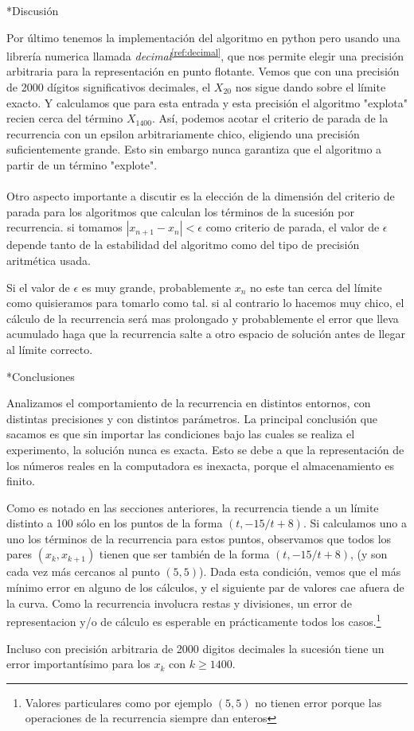 \documentclass[12pt,titlepage]{article}
\newenvironment{usection}[1]{\newpage\begin{section}*{#1}	\addcontentsline{toc}{section}{#1}}{\end{section}}
\newcommand{\superref}[1]{\textsuperscript{\ref{#1}}}
\begin{document}
\begin{usection}{Discusión}
		Por último tenemos la implementación del algoritmo en python
		pero usando una librería numerica llamada \textit{decimal}\superref{ref:decimal},
		que nos permite elegir una precisión arbitraria para
		la representación en punto flotante.
		Vemos que con una precisión de 2000 dígitos significativos decimales,
		el $X_{20}$ nos sigue dando sobre el límite exacto.
		Y calculamos que para esta entrada y esta precisión
		el algoritmo "explota" recien cerca del término $X_{1400}$.
		Así, podemos acotar el criterio de parada de la recurrencia
		con un epsilon arbitrariamente chico, eligiendo una precisión
		suficientemente grande. Esto sin embargo nunca garantiza
		que el algoritmo a partir de un término "explote". \\
\\
		Otro aspecto importante a discutir es la elección
		de la dimensión del criterio de parada para los algoritmos
		que calculan los términos de la sucesión por recurrencia.
		si tomamos $|x_{n+1}-x_n| < \epsilon$ como criterio de parada,
		el valor de $\epsilon$ depende tanto de la estabilidad
		del algoritmo como del tipo de precisión aritmética usada.

		Si el valor de $\epsilon$ es muy grande, probablemente $x_n$
		no este tan cerca del límite como quisieramos para tomarlo como tal.
		si al contrario lo hacemos muy chico, el cálculo de la recurrencia
		será mas prolongado y probablemente el error que lleva acumulado
		haga que la recurrencia salte a otro espacio de solución antes de llegar al límite correcto.

	\end{usection}
	
	\begin{usection}{Conclusiones}
		Analizamos el comportamiento de la recurrencia en distintos entornos, con distintas precisiones y con distintos parámetros.
		La principal conclusión que sacamos es que sin importar las condiciones bajo las cuales se realiza el experimento, la solución nunca es exacta.
		Esto se debe a que la representación de los números reales en la computadora es inexacta, porque el almacenamiento es finito.
		
		Como es notado en las secciones anteriores, la recurrencia tiende a un límite distinto a 100 sólo en los puntos de la forma $(t, -15/t + 8)$. Si calculamos uno a uno los términos de la recurrencia para estos puntos, observamos que todos los pares $(x_k,x_{k+1})$ tienen que ser también de la forma $(t, -15/t + 8)$, (y son cada vez más cercanos al punto $(5,5)$).
		Dada esta condición, vemos que el más mínimo error en alguno de los cálculos, y el siguiente par de valores cae afuera de la curva.
		Como la recurrencia involucra restas y divisiones, un error de representacion y/o de cálculo es esperable en prácticamente todos los casos.\footnote{Valores particulares como por ejemplo $(5,5)$ no tienen error porque las operaciones de la recurrencia siempre dan enteros}
		
		Incluso con precisión arbitraria de 2000 digitos decimales la sucesión tiene un error importantísimo para los $x_k$ con $k\geq 1400$.
		
	\end{usection}
	
\end{document}
